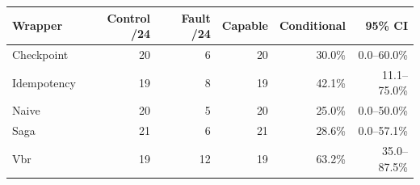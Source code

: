 \begin{tabular}{@{}lrrrrr@{}}\toprule
Wrapper & Control /24 & Fault /24 & Capable & Conditional & 95\% CI\\\midrule
Checkpoint & 20 & 6 & 20 & 30.0\% & 0.0--60.0\%\\
Idempotency & 19 & 8 & 19 & 42.1\% & 11.1--75.0\%\\
Naive & 20 & 5 & 20 & 25.0\% & 0.0--50.0\%\\
Saga & 21 & 6 & 21 & 28.6\% & 0.0--57.1\%\\
Vbr & 19 & 12 & 19 & 63.2\% & 35.0--87.5\%\\
\bottomrule
\end{tabular}
